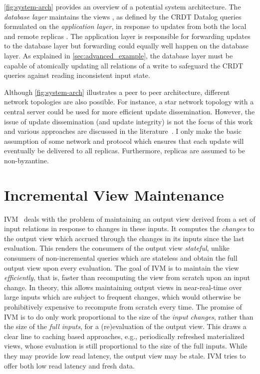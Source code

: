 

\ref{fig:system-arch} provides an overview of a potential system architecture.
The \emph{database layer} maintains the views \deltaO{},
as defined by the \ac{CRDT} Datalog queries formulated on the \emph{application layer},
in response to updates from both the local  and remote replicas
.
The application layer is responsible for forwarding updates to the database layer
but forwarding could equally well happen on the database layer.
As explained in \ref{sec:advanced_example}, the database layer must be capable
of atomically updating all relations of a write to safeguard the \ac{CRDT} queries
against reading inconsistent input state.

Although \ref{fig:system-arch} illustrates a peer to peer architecture,
different network topologies are also possible.
For instance, a star network topology with a central server could be used
for more efficient update dissemination.
However, the issue of update dissemination (and update integrity) is not the focus
of this work and various approaches are discussed in the literature~\cite{
    auvolat2019merkle, sanjuan2020merkle, kleppmann2024bluesky,
    kleppmann2022making
}.
I only make the basic assumption of some network and protocol
which ensures that each update will eventually be delivered to all replicas.
Furthermore, replicas are assumed to be non-byzantine.

\section{Incremental View Maintenance}\label{sec:ivm}

\Acf{IVM}~\cite{gupta1995maintenance} deals with the problem of maintaining
an output view derived from a set of input relations in response to changes
in these inputs.
It computes the \emph{changes} to the output view which accrued through
the changes in its inputs since the last evaluation.
This renders the consumers of the output view \emph{stateful},
unlike consumers of non-incremental queries which are stateless
and obtain the full output view upon every evaluation.
The goal of \ac{IVM} is to maintain the view \emph{efficiently}, that is,
faster than recomputing the view from scratch upon an input change.
In theory, this allows maintaining output views in near-real-time over large
inputs which are subject to frequent changes, which would otherwise be
prohibitively expensive to recompute from scratch every time.
The promise of \ac{IVM} is to do only work proportional to the
size of the \emph{input changes}, rather than the size of the \emph{full inputs},
for a (re)evaluation of the output view.
This draws a clear line to caching based approaches, e.g., periodically
refreshed materialized views, whose evaluation is still proportional
to the size of the full inputs.
While they may provide low read latency, the output view may be stale.
\ac{IVM} tries to offer both low read latency and fresh data.

